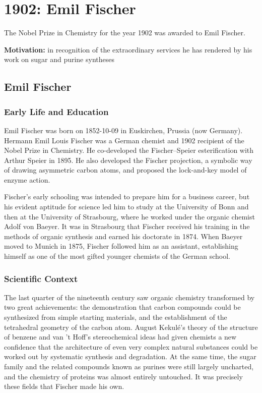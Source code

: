 \chapter{1902: Emil Fischer}
\label{chap:chemistry1902}

The Nobel Prize in Chemistry for the year 1902 was awarded to Emil Fischer.

\textbf{Motivation:}
in recognition of the extraordinary services he has rendered by his work on sugar and purine syntheses

\section{Emil Fischer}

\subsection*{Early Life and Education}

Emil Fischer was born on 1852-10-09 in Euskirchen, Prussia (now Germany).
Hermann Emil Louis Fischer was a German chemist and 1902 recipient of the Nobel Prize in Chemistry. He co-developed the Fischer--Speier esterification with Arthur Speier in 1895. He also developed the Fischer projection, a symbolic way of drawing asymmetric carbon atoms, and proposed the lock-and-key model of enzyme action.

Fischer's early schooling was intended to prepare him for a business career, but his evident aptitude for science led him to study at the University of Bonn and then at the University of Strasbourg, where he worked under the organic chemist Adolf von Baeyer. It was in Strasbourg that Fischer received his training in the methods of organic synthesis and earned his doctorate in 1874. When Baeyer moved to Munich in 1875, Fischer followed him as an assistant, establishing himself as one of the most gifted younger chemists of the German school.

\subsection*{Scientific Context}

The last quarter of the nineteenth century saw organic chemistry transformed by two great achievements: the demonstration that carbon compounds could be synthesized from simple starting materials, and the establishment of the tetrahedral geometry of the carbon atom. August Kekulé's theory of the structure of benzene and van 't Hoff's stereochemical ideas had given chemists a new confidence that the architecture of even very complex natural substances could be worked out by systematic synthesis and degradation. At the same time, the sugar family and the related compounds known as purines were still largely uncharted, and the chemistry of proteins was almost entirely untouched. It was precisely these fields that Fischer made his own.

